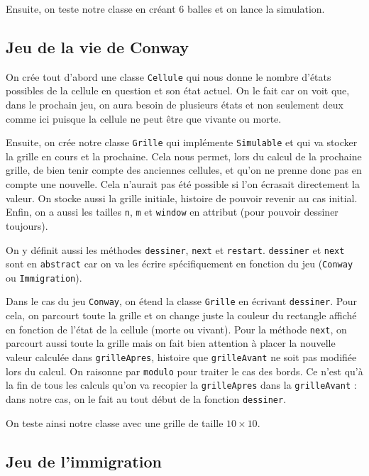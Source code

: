 \documentclass[a4paper, 11pt, french]{article}
\begin{document}
Ensuite, on teste notre classe en créant 6 balles et on lance la simulation.

\subsection{Jeu de la vie de Conway}

On crée tout d'abord une classe \verb|Cellule| qui nous donne le nombre d'états possibles de la cellule en question et son état actuel. On le fait car on voit que, dans le prochain jeu, on aura besoin de plusieurs états et non seulement deux comme ici puisque la cellule ne peut être que vivante ou morte.

Ensuite, on crée notre classe \verb|Grille| qui implémente \verb|Simulable| et qui va stocker la grille en cours et la prochaine. Cela nous permet, lors du calcul de la prochaine grille, de bien tenir compte des anciennes cellules, et qu'on ne prenne donc pas en compte une nouvelle. Cela n'aurait pas été possible si l'on écrasait directement la valeur. On stocke aussi la grille initiale, histoire de pouvoir revenir au cas initial. Enfin, on a aussi les tailles \verb|n|, \verb|m| et \verb|window| en attribut (pour pouvoir dessiner toujours).

On y définit aussi les méthodes \verb|dessiner|, \verb|next| et \verb|restart|. \verb|dessiner| et \verb|next| sont en \verb|abstract| car on va les écrire spécifiquement en fonction du jeu (\verb|Conway| ou \verb|Immigration|).

Dans le cas du jeu \verb|Conway|, on étend la classe \verb|Grille| en écrivant \verb|dessiner|. Pour cela, on parcourt toute la grille et on change juste la couleur du rectangle affiché en fonction de l'état de la cellule (morte ou vivant). Pour la méthode \verb|next|, on parcourt aussi toute la grille mais on fait bien attention à placer la nouvelle valeur calculée dans \verb|grilleApres|, histoire que \verb|grilleAvant| ne soit pas modifiée lors du calcul. On raisonne par \verb|modulo| pour traiter le cas des bords. Ce n'est qu'à la fin de tous les calculs qu'on va recopier la \verb|grilleApres| dans la \verb|grilleAvant| : dans notre cas, on le fait au tout début de la fonction \verb|dessiner|.

On teste ainsi notre classe avec une grille de taille $10 \times 10$.

\subsection{Jeu de l'immigration}
\end{document}
